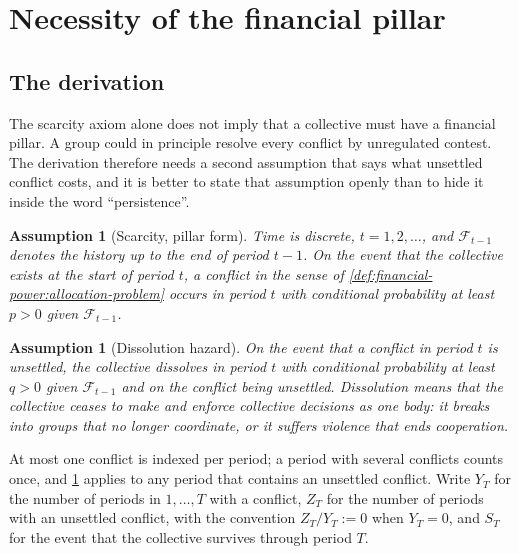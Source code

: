 \documentclass[11pt,letterpaper]{article}
\newtheorem{assumption}[theorem]{Assumption}
\theoremstyle{definition}
\theoremstyle{remark}
\begin{document}
\section{Necessity of the financial pillar}
\label{sec:necessity}

\subsection{The derivation}

The scarcity axiom alone does not imply that a collective must have a financial pillar. A group could in principle resolve every conflict by unregulated contest. The derivation therefore needs a second assumption that says what unsettled conflict costs, and it is better to state that assumption openly than to hide it inside the word ``persistence''.

\begin{assumption}[Scarcity, pillar form]
\label{ass:scarcity}
Time is discrete, $t=1,2,\dots$, and $\mathcal{F}_{t-1}$ denotes the history up to the end of period $t-1$. On the event that the collective exists at the start of period $t$, a conflict in the sense of \cref{def:financial-power:allocation-problem} occurs in period $t$ with conditional probability at least $p>0$ given $\mathcal{F}_{t-1}$.
\end{assumption}

\begin{assumption}[Dissolution hazard]
\label{ass:hazard}
On the event that a conflict in period $t$ is unsettled, the collective dissolves in period $t$ with conditional probability at least $q>0$ given $\mathcal{F}_{t-1}$ and on the conflict being unsettled. Dissolution means that the collective ceases to make and enforce collective decisions as one body: it breaks into groups that no longer coordinate, or it suffers violence that ends cooperation.
\end{assumption}

At most one conflict is indexed per period; a period with several conflicts counts once, and \cref{ass:hazard} applies to any period that contains an unsettled conflict. Write $Y_T$ for the number of periods in $1,\dots,T$ with a conflict, $Z_T$ for the number of periods with an unsettled conflict, with the convention $Z_T/Y_T:=0$ when $Y_T=0$, and $S_T$ for the event that the collective survives through period $T$.
\end{document}
